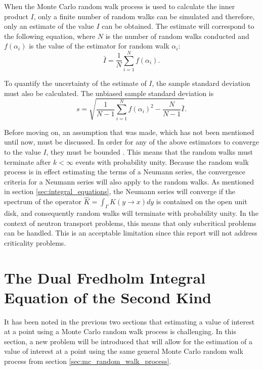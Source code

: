 When the Monte Carlo random walk process is used to calculate the inner product
$I$, only a finite number of random walks can be simulated and therefore, only 
an estimate of the value $I$ can be obtained. The estimate will
correspond to the following equation, where $N$ is the number of random walks
conducted and $f(\alpha_i)$ is the value of the estimator for random
walk $\alpha_i$:
\begin{equation}
  \bar{I} = \frac{1}{N} \sum_{i=1}^N f(\alpha_i).
  \label{eq:inner_product_estimate}
\end{equation}

To quantify the uncertainty of the estimate of $I$, the sample standard 
deviation must also be calculated. The unbiased sample standard deviation is 
\begin{equation}
  s = \sqrt{\frac{1}{N-1}\sum_{i=1}^N f(\alpha_i)^2 - \frac{N}{N-1}\bar{I}}.
  \label{eq:inner_product_stddev}
\end{equation}

Before moving on, an assumption that was made, which has not been mentioned
until now, must be discussed. In order for any of the above estimators to 
converge to the value $I$, they must be bounded \citep{spanier_monte_1969}. This
means that the random walks must terminate after $k < \infty$ events with 
probability unity. Because the random walk process is in effect estimating the
terms of a Neumann series, the convergence criteria for a Neumann series will
also apply to the random walks. As mentioned in section 
\ref{sec:integral_equations}, the Neumann series will converge if the spectrum
of the operator $\hat{K} = \int_{\Gamma} K(y \to x)dy$ is contained on the open
unit disk, and consequently random walks will terminate with probability unity.
In the context of neutron transport problems, this means that only subcritical 
problems can be handled. This is an acceptable limitation since this report 
will not address criticality problems.

\section{The Dual Fredholm Integral Equation of the Second Kind}
\label{sec:dual_problems}
It has been noted in the previous two sections that estimating a value of 
interest at a point using a Monte Carlo random walk process is challenging.
In this section, a new problem will be introduced that will allow for the 
estimation of a value of interest at a point using the same general
Monte Carlo random walk process from section \ref{sec:mc_random_walk_process}. 

